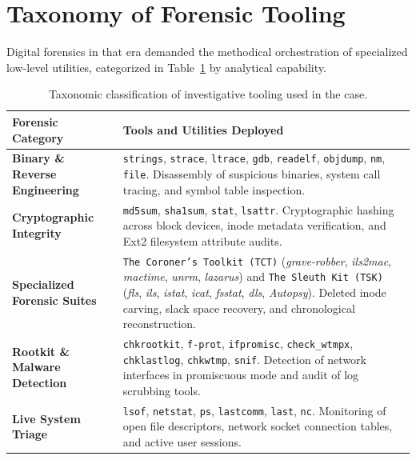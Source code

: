 \section{Taxonomy of Forensic Tooling}

Digital forensics in that era demanded the methodical orchestration of specialized low-level utilities, categorized in Table~\ref{tab:herramientas_forenses} by analytical capability.

\begin{table}[htbp]
\centering
\small
\begin{tabularx}{\textwidth}{@{} p{3.8cm} X @{}}
\toprule
\textbf{Forensic Category} & \textbf{Tools and Utilities Deployed} \\
\midrule
\textbf{Binary \& Reverse Engineering} & \texttt{strings}, \texttt{strace}, \texttt{ltrace}, \texttt{gdb}, \texttt{readelf}, \texttt{objdump}, \texttt{nm}, \texttt{file}. Disassembly of suspicious binaries, system call tracing, and symbol table inspection. \\
\addlinespace
\textbf{Cryptographic Integrity} & \texttt{md5sum}, \texttt{sha1sum}, \texttt{stat}, \texttt{lsattr}. Cryptographic hashing across block devices, inode metadata verification, and Ext2 filesystem attribute audits. \\
\addlinespace
\textbf{Specialized Forensic Suites} & \texttt{The Coroner's Toolkit (TCT)} (\textit{grave-robber}, \textit{ils2mac}, \textit{mactime}, \textit{unrm}, \textit{lazarus}) and \texttt{The Sleuth Kit (TSK)} (\textit{fls}, \textit{ils}, \textit{istat}, \textit{icat}, \textit{fsstat}, \textit{dls}, \textit{Autopsy}). Deleted inode carving, slack space recovery, and chronological reconstruction. \\
\addlinespace
\textbf{Rootkit \& Malware Detection} & \texttt{chkrootkit}, \texttt{f-prot}, \texttt{ifpromisc}, \texttt{check\_wtmpx}, \texttt{chklastlog}, \texttt{chkwtmp}, \texttt{snif}. Detection of network interfaces in promiscuous mode and audit of log scrubbing tools. \\
\addlinespace
\textbf{Live System Triage} & \texttt{lsof}, \texttt{netstat}, \texttt{ps}, \texttt{lastcomm}, \texttt{last}, \texttt{nc}. Monitoring of open file descriptors, network socket connection tables, and active user sessions. \\
\bottomrule
\end{tabularx}
\caption{Taxonomic classification of investigative tooling used in the case.}
\label{tab:herramientas_forenses}
\end{table}

